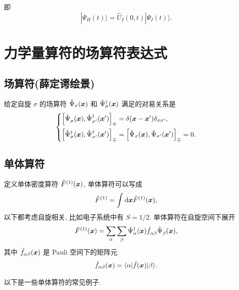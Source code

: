 即
\begin{equation}
   \boxed{|\Psi_H(t)\rangle=\hat U_I(0, t)|\Psi_I(t)\rangle. }
\end{equation}


\section{ 力学量算符的场算符表达式}

\subsection{ 场算符(薛定谔绘景)}

给定自旋 ${\sigma}$ 的场算符 $\hat \Psi_{\sigma}(\boldsymbol{x})$ 和 $\hat \Psi_{\sigma}^\dagger(\boldsymbol{x})$ 满足的对易关系是
\begin{equation}
   \left\{\begin{aligned}
      \left[ \hat\Psi^{}_{\sigma}(\boldsymbol{x}), \hat \Psi_{{\sigma}'}^\dagger(\boldsymbol{x}') \right]_{\mp}&=\delta(\boldsymbol{x}-\boldsymbol{x}')\delta_{{\sigma}{\sigma}'}, \\
      \left[ \hat\Psi^\dagger_{\sigma}(\boldsymbol{x}), \hat\Psi_{{\sigma}'}^\dagger(\boldsymbol{x}') \right]_{\mp}&=\left[ \hat\Psi_{\sigma}(\boldsymbol{x}), \hat\Psi_{{\sigma}'}(\boldsymbol{x}') \right]_{\mp}=0. 
      \end{aligned}\right. 
\end{equation}
\subsection{ 单体算符}

定义单体密度算符 $\hat F^{(1)}(\boldsymbol{x})$, 单体算符可以写成
\begin{equation}
   \hat F^{(1)}=\int\mathrm d\boldsymbol{x} \hat F^{(1)}(\boldsymbol{x}), 
\end{equation}
以下都考虑自旋相关, 比如电子系统中有 $S=1/2$. 单体算符在自旋空间下展开
\begin{equation}
   \hat F^{(1)}(\boldsymbol{x})=\sum_\alpha\sum_{\beta}\hat \Psi_{\alpha}^\dagger(\boldsymbol{x})\hat f^{}_{\alpha\beta}\hat \Psi^{}_\beta(\boldsymbol{x}), 
\end{equation}
其中 $\hat f_{\alpha\beta}(\boldsymbol{x})$ 是 Pauli 空间下的矩阵元
\begin{equation}
   \hat f_{\alpha\beta}(\boldsymbol{x})=\langle \alpha |\hat f(\boldsymbol{x})| \beta\rangle. 
\end{equation}

以下是一些单体算符的常见例子. 

